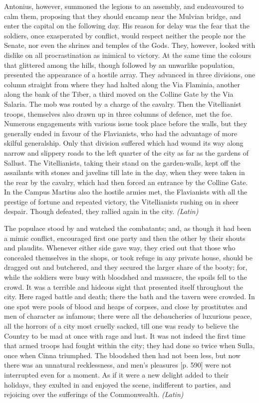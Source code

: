 Antonius, however, summoned the legions to an assembly, and endeavoured to calm them, proposing that they should encamp near the Mulvian bridge, and enter the capital on the following day. His reason for delay was the fear that the soldiers, once exasperated by conflict, would respect neither the people nor the Senate, nor even the shrines and temples of the Gods. They, however, looked with dislike on all procrastination as inimical to victory. At the same time the colours that glittered among the hills, though followed by an unwarlike population, presented the appearance of a hostile array. They advanced in three divisions, one column straight from where they had halted along the Via Flaminia, another along the bank of the Tiber, a third moved on the Colline Gate by the Via Salaria. The mob was routed by a charge of the cavalry. Then the Vitellianist troops, themselves also drawn up in three columns of defence, met the foe. Numerous engagements with various issue took place before the walls, but they generally ended in favour of the Flavianists, who had the advantage of more skilful generalship. Only that division suffered which had wound its way along narrow and slippery roads to the left quarter of the city as far as the gardens of Sallust. The Vitellianists, taking their stand on the garden-walls, kept off the assailants with stones and javelins till late in the day, when they were taken in the rear by the cavalry, which had then forced an entrance by the Colline Gate. In the Campus Martius also the hostile armies met, the Flavianists with all the prestige of fortune and repeated victory, the Vitellianists rushing on in sheer despair. Though defeated, they rallied again in the city. \emph{(Latin)}


The populace stood by and watched the combatants; and, as though it had been a mimic conflict, encouraged first one party and then the other by their shouts and plaudits. Whenever either side gave way, they cried out that those who concealed themselves in the shops, or took refuge in any private house, should be dragged out and butchered, and they secured the larger share of the booty; for, while the soldiers were busy with bloodshed and massacre, the spoils fell to the crowd. It was a terrible and hideous sight that presented itself throughout the city. Here raged battle and death; there the bath and the tavern were crowded. In one spot were pools of blood and heaps of corpses, and close by prostitutes and men of character as infamous; there were all the debaucheries of luxurious peace, all the horrors of a city most cruelly sacked, till one was ready to believe the Country to be mad at once with rage and lust. It was not indeed the first time that armed troops had fought within the city; they had done so twice when Sulla, once when Cinna triumphed. The bloodshed then had not been less, but now there was an unnatural recklessness, and men's pleasures [p. 590] were not interrupted even for a moment. As if it were a new delight added to their holidays, they exulted in and enjoyed the scene, indifferent to parties, and rejoicing over the sufferings of the Commonwealth. \emph{(Latin)}

